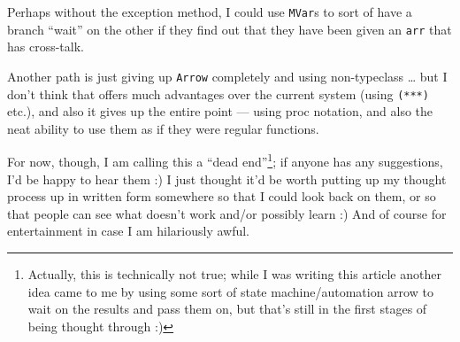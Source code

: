 \documentclass[]{article}
\begin{document}
Perhaps without the exception method, I could use \texttt{MVar}s to sort
of have a branch ``wait'' on the other if they find out that they have
been given an \texttt{arr} that has cross-talk.

Another path is just giving up \texttt{Arrow} completely and using
non-typeclass \ldots{} but I don't think that offers much advantages
over the current system (using \texttt{(***)} etc.), and also it gives
up the entire point --- using proc notation, and also the neat ability
to use them as if they were regular functions.

For now, though, I am calling this a ``dead end''\footnote{Actually,
  this is technically not true; while I was writing this article another
  idea came to me by using some sort of state machine/automation arrow
  to wait on the results and pass them on, but that's still in the first
  stages of being thought through :)}; if anyone has any suggestions,
I'd be happy to hear them :) I just thought it'd be worth putting up my
thought process up in written form somewhere so that I could look back
on them, or so that people can see what doesn't work and/or possibly
learn :) And of course for entertainment in case I am hilariously awful.
\end{document}
